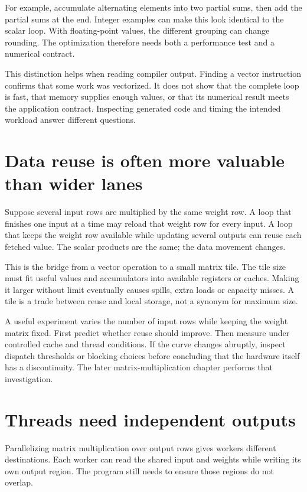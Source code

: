 For example, accumulate alternating elements into two partial sums,
then add the partial sums at the end. Integer examples can make this
look identical to the scalar loop. With floating-point values, the
different grouping can change rounding. The optimization therefore
needs both a performance test and a numerical contract.

This distinction helps when reading compiler output. Finding a vector
instruction confirms that some work was vectorized. It does not show
that the complete loop is fast, that memory supplies enough values,
or that its numerical result meets the application contract.
Inspecting generated code and timing the intended workload answer
different questions.

\section{Data reuse is often more valuable than wider lanes}
Suppose several input rows are multiplied by the same weight row.
A loop that finishes one input at a time may reload that weight row
for every input. A loop that keeps the weight row available while
updating several outputs can reuse each fetched value.
The scalar products are the same; the data movement changes.

This is the bridge from a vector operation to a small matrix tile.
The tile size must fit useful values and accumulators into available
registers or caches. Making it larger without limit eventually causes
spills, extra loads or capacity misses. A tile is a trade between
reuse and local storage, not a synonym for maximum size.

A useful experiment varies the number of input rows while keeping the
weight matrix fixed. First predict whether reuse should improve.
Then measure under controlled cache and thread conditions. If the
curve changes abruptly, inspect dispatch thresholds or blocking choices
before concluding that the hardware itself has a discontinuity.
The later matrix-multiplication chapter performs that investigation.

\section{Threads need independent outputs}
Parallelizing matrix multiplication over output rows gives workers
different destinations. Each worker can read the shared input and
weights while writing its own output region. The program still needs
to ensure those regions do not overlap.

